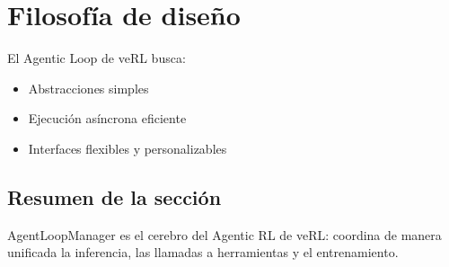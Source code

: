 \section{Filosofía de diseño}
El Agentic Loop de veRL busca:
\begin{itemize}
  \item Abstracciones simples
  \item Ejecución asíncrona eficiente
  \item Interfaces flexibles y personalizables
\end{itemize}

\subsection{Resumen de la sección}
AgentLoopManager es el cerebro del Agentic RL de veRL: coordina de manera unificada la inferencia, las llamadas a herramientas y el entrenamiento.

\newpage

